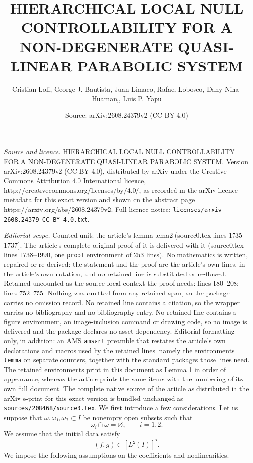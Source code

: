 \documentclass[10pt,a4paper]{amsart}
\title{HIERARCHICAL LOCAL NULL CONTROLLABILITY FOR A NON-DEGENERATE QUASI-LINEAR PARABOLIC SYSTEM}
\author{Cristian Loli, George J. Bautista, Juan Limaco, Rafael Lobosco, Dany Nina-Huaman,, Luis P. Yapu}
\date{Source: arXiv:2608.24379v2 (CC BY 4.0)}
\begin{document}
\maketitle

\noindent\emph{Source and licence.} HIERARCHICAL LOCAL NULL CONTROLLABILITY FOR A NON-DEGENERATE QUASI-LINEAR PARABOLIC SYSTEM. Version arXiv:2608.24379v2 (CC BY 4.0), distributed by arXiv under the Creative Commons Attribution 4.0 International licence, http://creativecommons.org/licenses/by/4.0/, as recorded in the arXiv licence metadata for this exact version and shown on the abstract page https://arxiv.org/abs/2608.24379v2. Full licence notice: \texttt{licenses/arxiv-2608.24379-CC-BY-4.0.txt}.\par\smallskip

\noindent\textit{Editorial scope.} Counted unit: the article's lemma lema2 (source0.tex lines 1735--1737). The article's complete original proof of it is delivered with it (source0.tex lines 1738--1990, one \texttt{proof} environment of 253 lines). No mathematics is written, repaired or re-derived: the statement and the proof are the article's own lines, in the article's own notation, and no retained line is substituted or re-flowed.  Retained uncounted as the source-local context the proof needs: lines 180--208; lines 752--755.  Nothing was omitted from any retained span, so the package carries no omission record.  No retained line contains a citation, so the wrapper carries no bibliography and no bibliography entry.  No retained line contains a figure environment, an image-inclusion command or drawing code, so no image is delivered and the package declares no asset dependency.  Editorial formatting only, in addition: an AMS \texttt{amsart} preamble that restates the article's own declarations and macros used by the retained lines, namely the environments \texttt{lemma} on separate counters, together with the standard packages those lines need.  The retained environments print in this document as Lemma 1 in order of appearance, whereas the article prints the same items with the numbering of its own full document.  The complete native source of the article as distributed in the arXiv e-print for this exact version is bundled unchanged as \texttt{sources/208468/source0.tex}.
 We first introduce a few considerations. Let us  suppose that $\omega,\omega_1,\omega_2\subset I$ be nonempty open subsets such that
\[
\omega_i\cap\omega=\varnothing,
\qquad i=1,2.
\]
We assume that the initial data satisfy
\[
(f,g)\in [L^2(I)]^2.
\]
We impose the following assumptions on the coefficients and nonlinearities.
\end{document}
